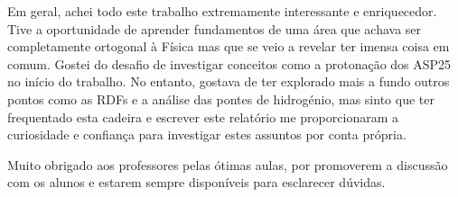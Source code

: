 \documentclass[12pt,a4paper]{article}
\begin{document}
	Em geral, achei todo este trabalho extremamente interessante e enriquecedor. Tive a oportunidade de aprender fundamentos de uma área que achava ser completamente ortogonal à Física mas que se veio a revelar ter imensa coisa em comum. Gostei do desafio de investigar conceitos como a protonação dos ASP25 no início do trabalho. No entanto, gostava de ter explorado mais a fundo outros pontos como as RDFs e a análise das pontes de hidrogénio, mas sinto que ter frequentado esta cadeira e escrever este relatório me proporcionaram a curiosidade e confiança para investigar estes assuntos por conta própria.
	
	Muito obrigado aos professores pelas ótimas aulas, por promoverem a discussão com os alunos e estarem sempre disponíveis para esclarecer dúvidas.
\newpage


\end{document}

